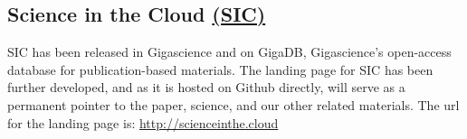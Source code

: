 \documentclass[simplex.tex]{subfiles}
\begin{document}
\subsection[Science in the Cloud]{Science in the Cloud \href{http://scienceinthe.cloud}{(SIC)}}

SIC has been released in Gigascience and on GigaDB, Gigascience's open-access database for publication-based materials.
The landing page for SIC has been further developed, and as it is hosted on Github directly, will serve as a permanent
pointer to the paper, science, and our other related materials. The url for the landing page is:
\url{http://scienceinthe.cloud}
\end{document}

